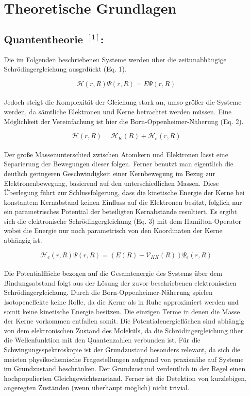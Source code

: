%
%

\section{Theoretische Grundlagen}
\subsection{Quantentheorie $^{[1]}$:}
Die im Folgenden beschriebenen Systeme werden über die zeitunabhängige Schrödingergleichung ausgrdückt (Eq. 1). 

\begin {equation}
\mathcal{H}\left(r,R\right)\Psi\left(r,R\right)=E\Psi\left(r,R\right)
\end {equation}
\\
Jedoch steigt die Komplexität der Gleichung stark an, umso größer die Systeme werden, da sämtliche Elektronen und Kerne betrachtet werden müssen. Eine Möglichkeit der Vereinfachung ist hier die Born-Oppenheimer-Näherung (Eq. 2). 

\begin {equation}
\mathcal{H}\left(r,R\right)=\mathcal{H}_{K}\left(R\right)+\mathcal{H}_{e}\left(r,R\right)
\end {equation}
\\
Der große Massenunterschied zwischen Atomkern und Elektronen lässt eine Separierung der Bewegungen dieser folgen. Ferner benutzt man eigentlich die deutlich geringeren Geschwindigkeit einer Kernbewegung im Bezug zur Elektronenbewegung, basierend auf den unterschiedlichen Massen. Diese Überlegung führt zur Schlussfolgerung, dass die kinetische Energie der Kerne bei konstantem Kernabstand keinen Einfluss auf die Elektronen besitzt, folglich nur ein parametrisches Potential der beteiligten Kernabstände resultiert. Es ergibt sich die elektronische Schrödingergleichung (Eq. 3) mit dem Hamilton-Operator wobei die Energie nur noch parametrisch von den Koordinaten der Kerne abhängig ist.

\begin {equation}
\mathcal{H}_e\left(r,R\right)\Psi\left(r,R\right)=\left(E\left(R\right)-\mathcal{V}_{KK}\left(R\right)\right)\Psi_e\left(r,R\right)
\end {equation}
\\
Die Potentialfläche bezogen auf die Gesamtenergie des Systems über dem Bindungsabstand folgt aus der Lösung der zuvor beschriebenen elektronischen Schrödingergleichung. Durch die Born-Oppenheimer-Näherung spielen Isotopeneffekte keine Rolle, da die Kerne als in Ruhe approximiert werden und somit keine kinetische Energie besitzen. Die einzigen Terme in denen die Masse der Kerne vorkommen entfallen somit. Die Potentialenergieflächen sind abhängig von dem elektronischen Zustand des Moleküls, da die Schrödingergleichung über die Wellenfunktion mit den Quantenzahlen verbunden ist. Für die Schwingungsspektroskopie ist der Grundzustand besonders relevant, da sich die meisten physikochemische Fragestellungen aufgrund von praxisnähe auf Systeme im Grundzustand beschränken. Der Grundzustand verdeutlich in der Regel einen hochpopulierten Gleichgewichtszustand. Ferner ist die Detektion von kurzlebigen, angeregten Zuständen (wenn überhaupt möglich) nicht trivial.
